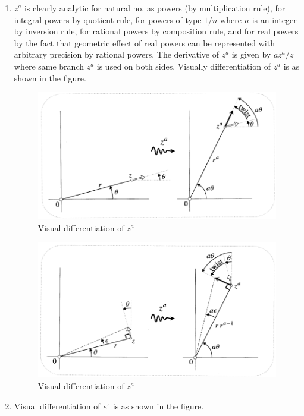 \documentclass[12pt]{article}
\begin{document}
\begin{enumerate}
        \item $z^a$ is clearly analytic for natural no. as powers (by multiplication rule), for integral powers by quotient rule, for powers of type $1/n$ where $n$ is an integer by inversion rule, for rational powers by composition rule, and for real powers by the fact that geometric effect of real powers can be represented with arbitrary precision by rational powers. The derivative of $z^a$ is given by $az^a/z$ where same branch $z^a$ is used on both sides. Visually differentiation of $z^a$ is as shown in the figure.
        \begin{figure}[h!]
            \centering
            \includegraphics[scale=0.75]{ztpa_1}
            \caption{Visual differentiation of $z^a$}
            \label{fig:fig_3}
        \end{figure}
        \begin{figure}[h!]
            \centering
            \includegraphics[scale=0.75]{ztpa_2}
            \caption{Visual differentiation of $z^a$}
            \label{fig:fig_4}
        \end{figure}
        \item Visual differentiation of $e^z$ is as shown in the figure.

\end{enumerate}
\end{document}

